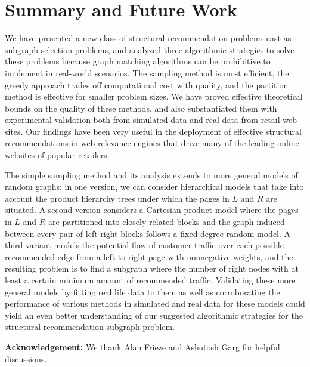 \newpage \section{Summary and Future Work}
We have presented a new class of structural recommendation problems
cast as subgraph selection problems, and analyzed three algorithmic
strategies to solve these problems because graph matching algorithms can be
prohibitive to implement in real-world scenarios. The sampling method is most
efficient, the greedy approach trades off computational cost with
quality, and the partition method is effective for smaller problem
sizes. We have proved effective theoretical bounds on the quality
of these methods, and also substantiated them with experimental
validation both from simulated data and real data from
retail web sites. Our findings have been very useful in the
deployment of effective structural recommendations in web relevance
engines that drive many of the leading online websites of popular
retailers. \vs

The simple sampling method and its analysis extends to more general
models of random graphs: in one version, we can consider
hierarchical models that take into account the product hierarchy
trees under which the pages in $L$ and $R$ are situated. A second
version considers a Cartesian product model where the pages in $L$
and $R$ are partitioned into closely related blocks and the graph
induced between every pair of left-right blocks follows a fixed
degree random model. A third variant models the potential flow of
customer traffic over each possible recommended edge from a left to
right page with nonnegative weights, and the resulting problem is
to find a subgraph where the number of right nodes with at least a
certain minimum amount of recommended traffic. Validating these
more general models by fitting real life data to them as well as
corroborating the performance of various methods in simulated and
real data for these models could yield an even better understanding
of our suggested algorithmic strategies for the structural
recommendation subgraph problem.\vs

{\bf Acknowledgement:} We thank Alan Frieze and Ashutosh Garg for helpful
discussions.

\vspace{-.1in}